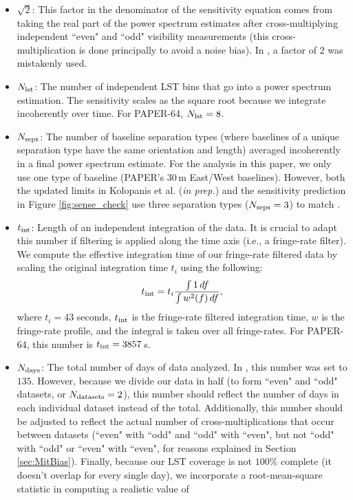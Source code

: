 \documentclass[preprint2,numberedappendix,tighten]{aastex6}  %
\begin{document}
\begin{itemize}
where $\nu$ are frequencies in GHz (\citealt{thompson_et_al2001}). We use a receiver temperature of $144$\,K, yielding $T_{\rm sys} = 431$\,K at $150$\,MHz. 
This is lower than the $T_{\rm sys}$ of $500$\,K used in  because of several small miscalculation errors that were 
identified\footnote{For example, there was a missing a square root in going from a variance to a standard deviation.}.
\item $\sqrt{2}$: This factor in the denominator of the sensitivity equation comes from taking the real part of the power spectrum 
estimates after cross-multiplying independent ``even" and ``odd" visibility measurements (this cross-multiplication is done principally to avoid a noise bias). In , a factor of $2$ was mistakenly used.
\item $N_{\rm lst}$: The number of independent LST bins that go into a power spectrum estimation. The sensitivity scales as the square root 
because we integrate incoherently over time. For PAPER-64, $N_{\rm lst} = 8$.
\item $N_{\rm seps}$: The number of baseline separation types (where baselines of a unique separation type have the same orientation and length) averaged incoherently in a final power spectrum estimate. For the 
analysis in this paper, we only use one type of baseline (PAPER's 30\,m East/West baselines). However, both the updated limits in Kolopanis et al. (\textit{in prep.}) and the sensitivity prediction in Figure \ref{fig:sense_check} use three separation types ($N_{\rm seps}=3$) to match .
\item $t_{\rm int}$: Length of an independent integration of the data. It is crucial to adapt this number if filtering is applied along the time axis (i.e., a 
fringe-rate filter). We compute the effective integration time of our fringe-rate filtered data by scaling the original integration time $t_{i}$
using the following:
\begin{equation}
t_{\rm int} = t_{i} \frac{\int1 \, df}{\int w^{2}(f) \,df},
\end{equation}
where $t_{i}=43$ seconds, $t_{\rm int}$ is the fringe-rate filtered integration time, $w$ is the fringe-rate profile, and the integral is 
taken over all fringe-rates. For PAPER-64, this number is $t_{\rm int} = 3857$\,s. 
\item $N_{\rm days}$: The total number of days of data analyzed. In , this number was set to $135$. However, because we 
divide our data in half (to form ``even" and ``odd" datasets, or $N_{\rm datasets} = 2$), this number should reflect the number of days in each individual dataset instead of the total. Additionally, this number should be adjusted to reflect the actual number of cross-multiplications that occur between datasets (``even" with ``odd" and ``odd" with ``even", but not ``odd" with ``odd" or ``even" with ``even", for reasons explained in Section \ref{sec:MitBias}). Finally, because our LST coverage is not $100\%$ complete (it doesn't overlap for every single day), we incorporate a root-mean-square statistic in computing a realistic value of 

\end{itemize}
\end{document}
